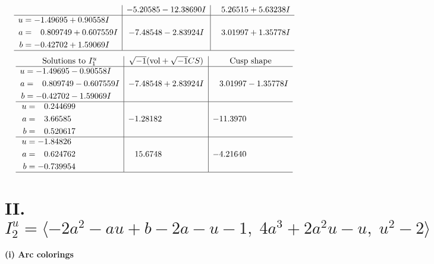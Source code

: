 \documentclass[1p]{elsarticle_modified}
\theoremstyle{definition}
\newcommand{\I}{\sqrt{-1}}
\begin{document}
$$\begin{array}{c|c|c}
 & -5.20585 - 12.38690 I & \phantom{-}5.26515 + 5.63238 I \\ \hline\begin{aligned}
u &= -1.49695 + 0.90558 I \\
a &= \phantom{-}0.809749 + 0.607559 I \\
b &= -0.42702 + 1.59069 I\end{aligned}
 & -7.48548 - 2.83924 I & \phantom{-}3.01997 + 1.35778 I\\
 \hline 
 \end{array}$$\newpage$$\begin{array}{c|c|c}  
\text{Solutions to }I^u_{1}& \I (\text{vol} + \sqrt{-1}CS) & \text{Cusp shape}\\
 \hline 
\begin{aligned}
u &= -1.49695 - 0.90558 I \\
a &= \phantom{-}0.809749 - 0.607559 I \\
b &= -0.42702 - 1.59069 I\end{aligned}
 & -7.48548 + 2.83924 I & \phantom{-}3.01997 - 1.35778 I \\ \hline\begin{aligned}
u &= \phantom{-}0.244699\phantom{ +0.000000I} \\
a &= \phantom{-}3.66585\phantom{ +0.000000I} \\
b &= \phantom{-}0.520617\phantom{ +0.000000I}\end{aligned}
 & -1.28182\phantom{ +0.000000I} & -11.3970\phantom{ +0.000000I} \\ \hline\begin{aligned}
u &= -1.84826\phantom{ +0.000000I} \\
a &= \phantom{-}0.624762\phantom{ +0.000000I} \\
b &= -0.739954\phantom{ +0.000000I}\end{aligned}
 & \phantom{-}15.6748\phantom{ +0.000000I} & -4.21640\phantom{ +0.000000I}\\
 \hline 
 \end{array}$$\newpage\newpage\renewcommand{\arraystretch}{1}
\centering \section*{II. $I^u_{2}= \langle -2 a^2- a u+b-2 a- u-1,\;4 a^3+2 a^2 u- u,\;u^2-2 \rangle$}
\flushleft \textbf{(i) Arc colorings}\\
\end{document}
